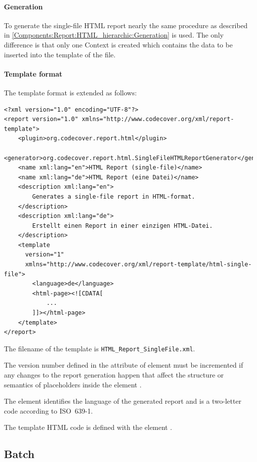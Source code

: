 \paragraph{Generation}

To generate the single-file HTML report nearly the same procedure as described in \ref{Components:Report:HTML_hierarchic:Generation} is used. The only difference is that only one Context is created which contains the data to be inserted into the template of the file.

\paragraph{Template format}

The template format is extended as follows:
\begin{verbatim}
<?xml version="1.0" encoding="UTF-8"?>
<report version="1.0" xmlns="http://www.codecover.org/xml/report-template">
    <plugin>org.codecover.report.html</plugin>
    <generator>org.codecover.report.html.SingleFileHTMLReportGenerator</generator>
    <name xml:lang="en">HTML Report (single-file)</name>
    <name xml:lang="de">HTML Report (eine Datei)</name>
    <description xml:lang="en">
        Generates a single-file report in HTML-format.
    </description>
    <description xml:lang="de">
        Erstellt einen Report in einer einzigen HTML-Datei.
    </description>
    <template
      version="1"
      xmlns="http://www.codecover.org/xml/report-template/html-single-file">
        <language>de</language>
        <html-page><![CDATA[
            ...
        ]]></html-page>
    </template>
</report>
\end{verbatim}
The filename of the template is \texttt{HTML\_Report\_SingleFile.xml}.

The version number defined in the attribute  of element  must be incremented if any changes to the report generation happen that affect the structure or semantics of placeholders inside the element .

The element  identifies the language of the generated report and is a two-letter code according to ISO~639-1.

The template HTML code is defined with the element .

\subsection{Batch}

